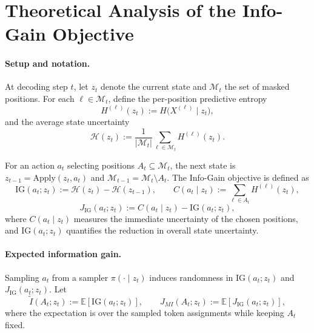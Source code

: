 \section{Theoretical Analysis of the Info-Gain Objective}
\label{appendix:mi_upper_bound}



\paragraph{Setup and notation.}
At decoding step $t$, let $z_t$ denote the current state and $\mathcal{M}_t$ the set of masked positions.  
For each $\ell \in \mathcal{M}_t$, define the per-position predictive entropy
\begin{equation}
H^{(\ell)}(z_t) := H\big(X^{(\ell)} \mid z_t\big),
\end{equation}
and the average state uncertainty
\begin{equation}
\mathcal{H}(z_t) := \frac{1}{|\mathcal{M}_t|} \sum_{\ell \in \mathcal{M}_t} H^{(\ell)}(z_t).
\end{equation}

For an action $a_t$ selecting positions $A_t \subseteq \mathcal{M}_t$, the next state is $z_{t-1} = \mathrm{Apply}(z_t, a_t)$ and $\mathcal{M}_{t-1} = \mathcal{M}_t \setminus A_t$. The Info-Gain objective is defined as
\begin{equation}
\mathrm{IG}(a_t; z_t) := \mathcal{H}(z_t) - \mathcal{H}(z_{t-1}), \qquad
C(a_t \mid z_t) := \sum_{\ell \in A_t} H^{(\ell)}(z_t),
\end{equation}
\begin{equation}
J_{\mathrm{IG}}(a_t; z_t) := C(a_t \mid z_t) - \mathrm{IG}(a_t; z_t),
\end{equation}
where $C(a_t\mid z_t)$ measures the immediate uncertainty of the chosen positions, and $\mathrm{IG}(a_t; z_t)$ quantifies the reduction in overall state uncertainty.

\paragraph{Expected information gain.}
Sampling $a_t$ from a sampler $\pi(\cdot \mid z_t)$ induces randomness in $\mathrm{IG}(a_t; z_t)$ and $J_{\mathrm{IG}}(a_t; z_t)$. Let
\begin{equation}
\tilde{I}(A_t; z_t) := \mathbb{E}[\mathrm{IG}(a_t; z_t)], \qquad
J_{MI}(A_t; z_t) := \mathbb{E}[J_{\mathrm{IG}}(a_t; z_t)],
\end{equation}
where the expectation is over the sampled token assignments while keeping $A_t$ fixed.

